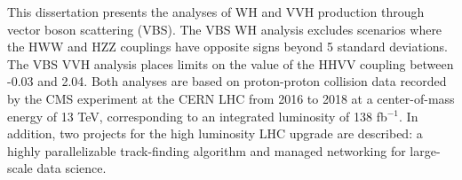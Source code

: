 \begin{dissertationabstract}
    This dissertation presents the analyses of WH and VVH production through vector boson scattering (VBS). 
    The VBS WH analysis excludes scenarios where the HWW and HZZ couplings have opposite signs beyond 5 standard deviations. 
    The VBS VVH analysis places limits on the value of the HHVV coupling between -0.03 and 2.04. 
    Both analyses are based on proton-proton collision data recorded by the CMS experiment at the CERN LHC from 2016 to 2018 at a center-of-mass energy of 13 TeV, corresponding to an integrated luminosity of 138 fb$^{-1}$. 
    In addition, two projects for the high luminosity LHC upgrade are described: a highly parallelizable track-finding algorithm and managed networking for large-scale data science. 
\end{dissertationabstract}
